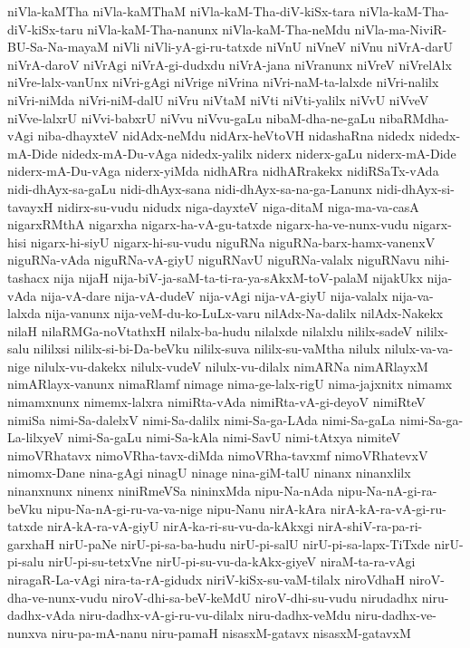 {niVla-kaMTha
niVla-kaMThaM
niVla-kaM-Tha-diV-kiSx-tara
niVla-kaM-Tha-diV-kiSx-taru
niVla-kaM-Tha-nanunx
niVla-kaM-Tha-neMdu
niVla-ma-NiviR-BU-Sa-Na-mayaM
niVli
niVli-yA-gi-ru-tatxde
niVnU
niVneV
niVnu
niVrA-darU
niVrA-daroV
niVrAgi
niVrA-gi-dudxdu
niVrA-jana
niVranunx
niVreV
niVrelAlx
niVre-lalx-vanUnx
niVri-gAgi
niVrige
niVrina
niVri-naM-ta-lalxde
niVri-nalilx
niVri-niMda
niVri-niM-dalU
niVru
niVtaM
niVti
niVti-yalilx
niVvU
niVveV
niVve-lalxrU
niVvi-babxrU
niVvu
niVvu-gaLu
nibaM-dha-ne-gaLu
nibaRMdha-vAgi
niba-dhayxteV
nidAdx-neMdu
nidArx-heVtoVH
nidashaRna
nidedx
nidedx-mA-Dide
nidedx-mA-Du-vAga
nidedx-yalilx
niderx
niderx-gaLu
niderx-mA-Dide
niderx-mA-Du-vAga
niderx-yiMda
nidhARra
nidhARrakekx
nidiRSaTx-vAda
nidi-dhAyx-sa-gaLu
nidi-dhAyx-sana
nidi-dhAyx-sa-na-ga-Lanunx
nidi-dhAyx-si-tavayxH
nidirx-su-vudu
nidudx
niga-dayxteV
niga-ditaM
niga-ma-va-casA
nigarxRMthA
nigarxha
nigarx-ha-vA-gu-tatxde
nigarx-ha-ve-nunx-vudu
nigarx-hisi
nigarx-hi-siyU
nigarx-hi-su-vudu
niguRNa
niguRNa-barx-hamx-vanenxV
niguRNa-vAda
niguRNa-vA-giyU
niguRNavU
niguRNa-valalx
niguRNavu
nihi-tashacx
nija
nijaH
nija-biV-ja-saM-ta-ti-ra-ya-sAkxM-toV-palaM
nijakUkx
nija-vAda
nija-vA-dare
nija-vA-dudeV
nija-vAgi
nija-vA-giyU
nija-valalx
nija-va-lalxda
nija-vanunx
nija-veM-du-ko-LuLx-varu
nilAdx-Na-dalilx
nilAdx-Nakekx
nilaH
nilaRMGa-noVtathxH
nilalx-ba-hudu
nilalxde
nilalxlu
nililx-sadeV
nililx-salu
nililxsi
nililx-si-bi-Da-beVku
nililx-suva
nililx-su-vaMtha
nilulx
nilulx-va-va-nige
nilulx-vu-dakekx
nilulx-vudeV
nilulx-vu-dilalx
nimARNa
nimARlayxM
nimARlayx-vanunx
nimaRlamf
nimage
nima-ge-lalx-rigU
nima-jajxnitx
nimamx
nimamxnunx
nimemx-lalxra
nimiRta-vAda
nimiRta-vA-gi-deyoV
nimiRteV
nimiSa
nimi-Sa-dalelxV
nimi-Sa-dalilx
nimi-Sa-ga-LAda
nimi-Sa-gaLa
nimi-Sa-ga-La-lilxyeV
nimi-Sa-gaLu
nimi-Sa-kAla
nimi-SavU
nimi-tAtxya
nimiteV
nimoVRhatavx
nimoVRha-tavx-diMda
nimoVRha-tavxmf
nimoVRhatevxV
nimomx-Dane
nina-gAgi
ninagU
ninage
nina-giM-talU
ninanx
ninanxlilx
ninanxnunx
ninenx
niniRmeVSa
nininxMda
nipu-Na-nAda
nipu-Na-nA-gi-ra-beVku
nipu-Na-nA-gi-ru-va-va-nige
nipu-Nanu
nirA-kAra
nirA-kA-ra-vA-gi-ru-tatxde
nirA-kA-ra-vA-giyU
nirA-ka-ri-su-vu-da-kAkxgi
nirA-shiV-ra-pa-ri-garxhaH
nirU-paNe
nirU-pi-sa-ba-hudu
nirU-pi-salU
nirU-pi-sa-lapx-TiTxde
nirU-pi-salu
nirU-pi-su-tetxVne
nirU-pi-su-vu-da-kAkx-giyeV
niraM-ta-ra-vAgi
niragaR-La-vAgi
nira-ta-rA-gidudx
niriV-kiSx-su-vaM-tilalx
niroVdhaH
niroV-dha-ve-nunx-vudu
niroV-dhi-sa-beV-keMdU
niroV-dhi-su-vudu
nirudadhx
niru-dadhx-vAda
niru-dadhx-vA-gi-ru-vu-dilalx
niru-dadhx-veMdu
niru-dadhx-ve-nunxva
niru-pa-mA-nanu
niru-pamaH
nisasxM-gatavx
nisasxM-gatavxM
}
